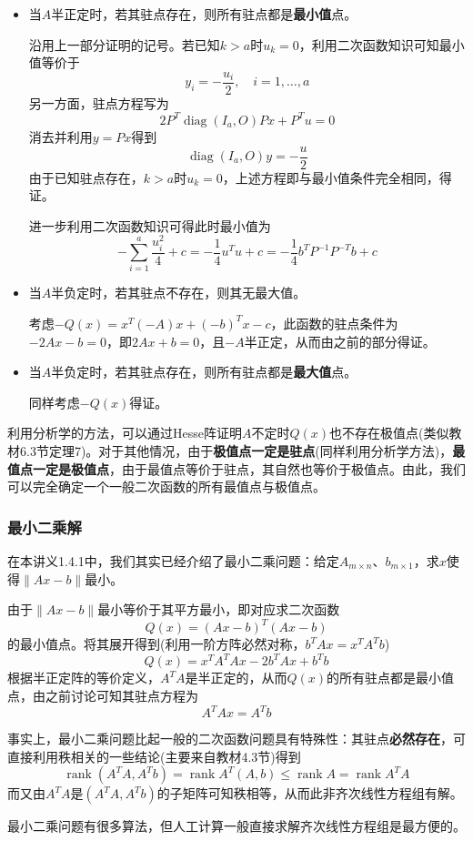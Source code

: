 \documentclass[a4paper,UTF8,fontset=windows]{ctexart}
\DeclareMathOperator{\diag}{diag}
\DeclareMathOperator{\rank}{rank}
\newcommand*{\note}{\noindent *}
\begin{document}
\begin{itemize}
    \item 当$A$半正定时，若其驻点存在，则所有驻点都是\textbf{最小值}点。
    
    沿用上一部分证明的记号。若已知$k>a$时$u_k=0$，利用二次函数知识可知最小值等价于
    $$y_i=-\frac{u_i}{2},\quad i=1,\dots,a$$
    另一方面，驻点方程写为
    $$2P^T\diag(I_a,O)Px+P^Tu=0$$
    消去并利用$y=Px$得到
    $$\diag(I_a,O)y=-\frac{u}{2}$$
    由于已知驻点存在，$k>a$时$u_k=0$，上述方程即与最小值条件完全相同，得证。

    \note 进一步利用二次函数知识可得此时最小值为
    $$-\sum_{i=1}^a\frac{u_i^2}{4}+c=-\frac{1}{4}u^Tu+c=-\frac{1}{4}b^TP^{-1}P^{-T}b+c$$

    \item 当$A$半负定时，若其驻点不存在，则其无最大值。
    
    考虑$-Q(x)=x^T(-A)x+(-b)^Tx-c$，此函数的驻点条件为$-2Ax-b=0$，即$2Ax+b=0$，且$-A$半正定，从而由之前的部分得证。
    
    \item 当$A$半负定时，若其驻点存在，则所有驻点都是\textbf{最大值}点。
    
    同样考虑$-Q(x)$得证。
\end{itemize}

利用分析学的方法，可以通过Hesse阵证明$A$不定时$Q(x)$也不存在极值点(类似教材6.3节定理7)。对于其他情况，由于\textbf{极值点一定是驻点}(同样利用分析学方法)，\textbf{最值点一定是极值点}，由于最值点等价于驻点，其自然也等价于极值点。由此，我们可以完全确定一个一般二次函数的所有最值点与极值点。

\subsubsection{最小二乘解}
在本讲义1.4.1中，我们其实已经介绍了最小二乘问题：给定$A_{m\times n}$、$b_{m\times 1}$，求$x$使得$\|Ax-b\|$最小。

由于$\|Ax-b\|$最小等价于其平方最小，即对应求二次函数
$$Q(x)=(Ax-b)^T(Ax-b)$$
的最小值点。将其展开得到(利用一阶方阵必然对称，$b^TAx=x^TA^Tb$)
$$Q(x)=x^TA^TAx-2b^TAx+b^Tb$$
根据半正定阵的等价定义，$A^TA$是半正定的，从而$Q(x)$的所有驻点都是最小值点，由之前讨论可知其驻点方程为
$$A^TAx=A^Tb$$

事实上，最小二乘问题比起一般的二次函数问题具有特殊性：其驻点\textbf{必然存在}，可直接利用秩相关的一些结论(主要来自教材4.3节)得到
$$\rank(A^TA,A^Tb)=\rank A^T(A,b)\le\rank A=\rank A^TA$$
而又由$A^TA$是$(A^TA,A^Tb)$的子矩阵可知秩相等，从而此非齐次线性方程组有解。

\note 最小二乘问题有很多算法，但人工计算一般直接求解齐次线性方程组是最方便的。
\end{document}
